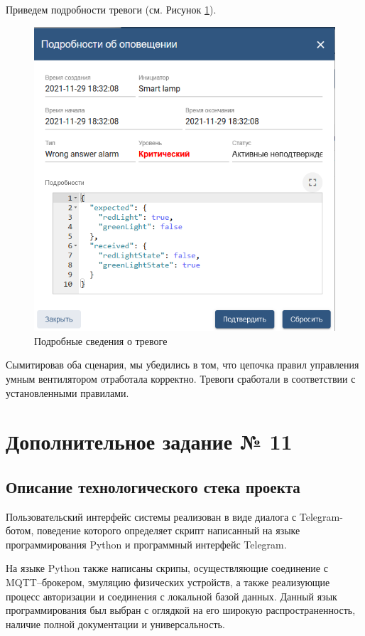 \documentclass[a4paper,14pt]{extarticle}
\begin{document}
Приведем подробности тревоги (см. Рисунок \ref{fig:t2-alarm-wrong-response-detail}).
\begin{figure}[h!]
	\centering
	\includegraphics[width=0.7\linewidth]{images/t2-alarm-wrong-response-detail}
	\caption{Подробные сведения о тревоге}
	\label{fig:t2-alarm-wrong-response-detail}
\end{figure}

Сымитировав оба сценария, мы убедились в том, что цепочка правил управления умным вентилятором отработала корректно. Тревоги сработали в соответствии с установленными правилами.

\section{Дополнительное задание № 11}

\subsection{Описание технологического стека проекта}

Пользовательский интерфейс системы реализован в виде диалога с Telegram-ботом, поведение которого определяет скрипт написанный на языке программирования Python и программный интерфейс Telegram. 

На языке Python также написаны скрипы, осуществляющие соединение с \mbox{MQTT--брокером}, эмуляцию физических устройств, а также реализующие процесс авторизации и соединения с локальной базой данных. Данный язык программирования был выбран с оглядкой на его широкую распространенность, наличие полной документации и универсальность.
\end{document}
